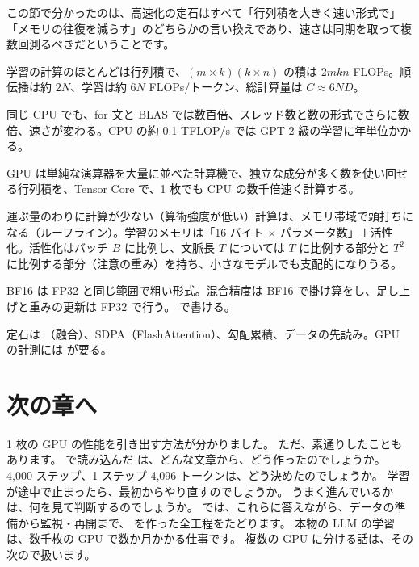 この節で分かったのは、高速化の定石はすべて「行列積を大きく速い形式で」「メモリの往復を減らす」のどちらかの言い換えであり、速さは同期を取って複数回測るべきだということです。

\begin{summary}
\item 学習の計算のほとんどは行列積で、$(m\times k)(k\times n)$ の積は $2mkn$ FLOPs。順伝播は約 $2N$、学習は約 $6N$ FLOPs/トークン、総計算量は $C\approx6ND$。
\item 同じ CPU でも、for 文と BLAS では数百倍、スレッド数と数の形式でさらに数倍、速さが変わる。CPU の約 0.1 TFLOP/s では GPT-2 級の学習に年単位かかる。
\item GPU は単純な演算器を大量に並べた計算機で、独立な成分が多く数を使い回せる行列積を、Tensor Core で、1 枚でも CPU の数千倍速く計算する。
\item 運ぶ量のわりに計算が少ない（算術強度が低い）計算は、メモリ帯域で頭打ちになる（ルーフライン）。学習のメモリは「16 バイト $\times$ パラメータ数」＋活性化。活性化はバッチ $B$ に比例し、文脈長 $T$ については $T$ に比例する部分と $T^2$ に比例する部分（注意の重み）を持ち、小さなモデルでも支配的になりうる。
\item BF16 は FP32 と同じ範囲で粗い形式。混合精度は BF16 で掛け算をし、足し上げと重みの更新は FP32 で行う。 で書ける。
\item 定石は （融合）、SDPA（FlashAttention）、勾配累積、データの先読み。GPU の計測には  が要る。
\end{summary}

\section*{次の章へ}
1 枚の GPU の性能を引き出す方法が分かりました。
ただ、素通りしたこともあります。
で読み込んだ  は、どんな文章から、どう作ったのでしょうか。
4,000 ステップ、1 ステップ 4,096 トークンは、どう決めたのでしょうか。
学習が途中で止まったら、最初からやり直すのでしょうか。
うまく進んでいるかは、何を見て判断するのでしょうか。
では、これらに答えながら、データの準備から監視・再開まで、 を作った全工程をたどります。
本物の LLM の学習は、数千枚の GPU で数か月かかる仕事です。
複数の GPU に分ける話は、その次ので扱います。

